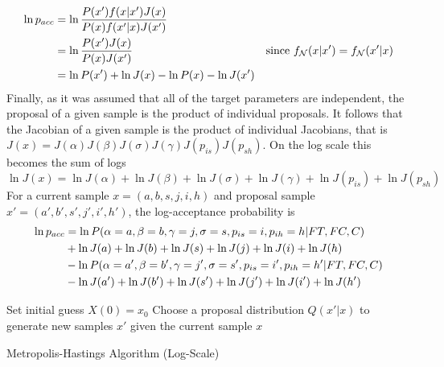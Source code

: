 \begin{align} \notag
	\ln p_{acc} &= \ln \frac{P(x') f(x | x') J(x)}{P(x)f(x'|x)J(x')} \\ \notag
	&= \ln \frac{P(x')J(x)}{P(x)J(x')} & \text{since } f_\mathcal{N}(x | x') = f_\mathcal{N}(x' | x)\\
	&= \ln P(x')+\ln J(x) - \ln P(x) - \ln J(x')
\end{align}
Finally, as it was assumed that all of the target parameters are independent, the proposal of a given sample is the product of individual proposals. It follows that the Jacobian of a given sample is the product of individual Jacobians, that is $J(x) = J(\alpha)J(\beta)J(\sigma)J(\gamma)J(p_{is})J(p_{sh})$. On the log scale this becomes the sum of logs \[ \ln J(x)  = \ln J(\alpha) + \ln J(\beta) + \ln J(\sigma) + \ln J(\gamma) + \ln J(p_{is}) + \ln J(p_{sh}) \]
For a current sample $x=(a,b,s,j,i,h)$ and proposal sample $x'=(a',b',s',j',i',h')$, the log-acceptance probability is
\begin{align} \notag
\ln p_{acc} &= \ln P(\alpha=a, \beta=b, \gamma=j, \sigma=s, p_{is}=i, p_{ih}=h | FT, FC, C) \\ \notag
&+ \ln J(a) + \ln J(b) + \ln J(s) + \ln J(j) + \ln J(i) + \ln J(h) \\ \notag
&- \ln P(\alpha=a', \beta=b', \gamma=j', \sigma=s', p_{is}=i', p_{ih}=h' | FT, FC, C) \\
&- \ln J(a') + \ln J(b') + \ln J(s') + \ln J(j') + \ln J(i') + \ln J(h') 
\end{align}

\begin{algorithm}[H]
	\SetAlgoLined
	Set initial guess $X(0) = x_0$ \;
	Choose a proposal distribution $Q(x'|x)$ to generate new samples $x'$ given the current sample $x$\;
	\caption{Metropolis-Hastings Algorithm (Log-Scale)}
	\label{alg: log Metropolis-Hastings}
\end{algorithm}

